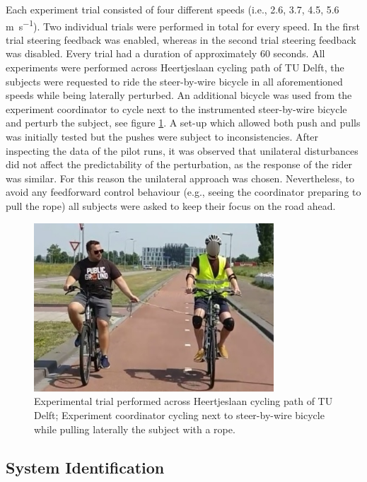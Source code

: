 Each experiment trial consisted of four different speeds (i.e., 2.6, 3.7, 4.5, 5.6 \si{\meter\per s}). Two individual trials were performed in total for every speed. In the first trial steering feedback was enabled, whereas in the second trial steering feedback was disabled. Every trial had a duration of approximately 60 seconds. All experiments were performed across Heertjeslaan cycling path of TU Delft, the subjects were requested to ride the steer-by-wire bicycle in all aforementioned speeds while being laterally perturbed. An additional bicycle was used from the experiment coordinator to cycle next to the instrumented steer-by-wire bicycle and perturb the subject, see figure \ref{lateralexperiment}. A set-up which allowed both push and pulls was initially tested but the pushes were subject to inconsistencies. After inspecting the data of the pilot runs, it was observed that unilateral disturbances did not affect the predictability of the perturbation, as the response of the rider was similar. For this reason the unilateral approach was chosen. Nevertheless, to avoid any feedforward control behaviour (e.g., seeing the coordinator preparing to pull the rope) all subjects were asked to keep their focus on the road ahead. 

\begin{figure}[htbp]
\centering
\includegraphics [width=0.8\textwidth]{images/lateralexperiment.jpg}
\caption{Experimental trial performed across Heertjeslaan cycling path of TU Delft; Experiment coordinator cycling next to steer-by-wire bicycle while pulling laterally the subject with a rope.}
\label{lateralexperiment}
\end{figure}

\subsection{System Identification}


